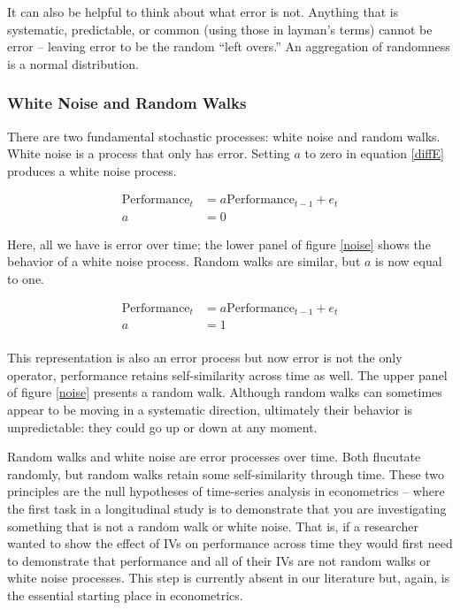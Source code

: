 \documentclass[english,,man]{apa6}
\theoremstyle{definition}
\theoremstyle{definition}
\theoremstyle{definition}
\theoremstyle{remark}
\begin{document}
It can also be helpful to think about what error is not. Anything that
is systematic, predictable, or common (using those in layman's terms)
cannot be error -- leaving error to be the random \enquote{left overs.}
An aggregation of randomness is a normal distribution.

\hypertarget{white-noise-and-random-walks}{%
\subsubsection{White Noise and Random
Walks}\label{white-noise-and-random-walks}}

There are two fundamental stochastic processes: white noise and random
walks. White noise is a process that only has error. Setting \(a\) to
zero in equation \ref{diffE} produces a white noise process.

\begin{equation}
\begin{split}
\label{whitenoise}
\textrm{Performance}_{t} &= a \textrm{Performance}_{t-1} + e_{t} \\
a &= 0
\end{split}
\end{equation}

\noindent Here, all we have is error over time; the lower panel of
figure \ref{noise} shows the behavior of a white noise process. Random
walks are similar, but \(a\) is now equal to one.

\begin{equation}
\begin{split}
\label{rw}
\textrm{Performance}_{t} &= a \textrm{Performance}_{t-1} + e_{t} \\ 
a &= 1 \\ 
\end{split}
\end{equation}

\noindent This representation is also an error process but now error is
not the only operator, performance retains self-similarity across time
as well. The upper panel of figure \ref{noise} presents a random walk.
Although random walks can sometimes appear to be moving in a systematic
direction, ultimately their behavior is unpredictable: they could go up
or down at any moment.

Random walks and white noise are error processes over time. Both
flucutate randomly, but random walks retain some self-similarity through
time. These two principles are the null hypotheses of time-series
analysis in econometrics -- where the first task in a longitudinal study
is to demonstrate that you are investigating something that is not a
random walk or white noise. That is, if a researcher wanted to show the
effect of IVs on performance across time they would first need to
demonstrate that performance and all of their IVs are not random walks
or white noise processes. This step is currently absent in our
literature but, again, is the essential starting place in econometrics.
\end{document}
